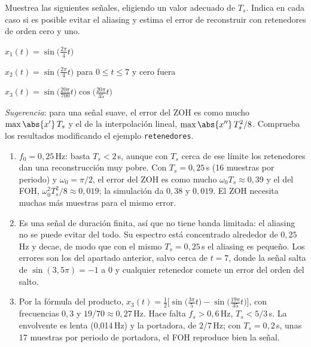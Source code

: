 \documentclass[11pt,a4paper]{scrartcl}
\begin{document}
\begin{ejercicio}
  Muestrea las siguientes señales, eligiendo un valor adecuado de $T_s$. Indica en cada caso si es posible evitar el aliasing y estima el error de reconstruir con retenedores de orden cero y uno.
  \begin{incisos}[1]
    \item $x_1(t)=\sin\big(\frac{2\pi}{4}t\big)$
    \item $x_2(t)=\sin\big(\frac{2\pi}{4}t\big)$ para $0\le t\le7$ y cero fuera
    \item $x_3(t)=\sin\big(\frac{20\pi}{700}t\big)\cos\big(\frac{20\pi}{35}t\big)$
  \end{incisos}
  \emph{Sugerencia}: para una señal suave, el error del ZOH es como mucho $\max\abs{x'}\,T_s$ y el de la interpolación lineal, $\max\abs{x''}\,T_s^2/8$. Comprueba los resultados modificando el ejemplo \texttt{retenedores}.
\end{ejercicio}
\begin{solucion}
  \begin{enumerate}[label=\alph*)]
    \item $f_0=0{,}25$\,Hz: basta $T_s<2$\,s, aunque con $T_s$ cerca de ese límite los retenedores dan una reconstrucción muy pobre. Con $T_s=0{,}25$\,s (16 muestras por periodo) y $\omega_0=\pi/2$, el error del ZOH es como mucho $\omega_0T_s\approx0{,}39$ y el del FOH, $\omega_0^2T_s^2/8\approx0{,}019$; la simulación da $0{,}38$ y $0{,}019$. El ZOH necesita muchas más muestras para el mismo error.
    \item Es una señal de duración finita, así que no tiene banda limitada: el aliasing no se puede evitar del todo. Su espectro está concentrado alrededor de $0{,}25$\,Hz y decae, de modo que con el mismo $T_s=0{,}25$\,s el aliasing es pequeño. Los errores son los del apartado anterior, salvo cerca de $t=7$, donde la señal salta de $\sin(3{,}5\pi)=-1$ a 0 y cualquier retenedor comete un error del orden del salto.
    \item Por la fórmula del producto, $x_3(t)=\frac12\big[\sin\big(\frac{3\pi}{5}t\big)-\sin\big(\frac{19\pi}{35}t\big)\big]$, con frecuencias $0{,}3$ y $19/70\approx0{,}27$\,Hz. Hace falta $f_s>0{,}6$\,Hz, $T_s<5/3$\,s. La envolvente es lenta (0,014\,Hz) y la portadora, de $2/7$\,Hz; con $T_s=0{,}2$\,s, unas 17 muestras por periodo de portadora, el FOH reproduce bien la señal.
  \end{enumerate}
\end{solucion}
\end{document}
